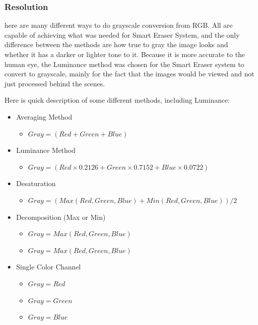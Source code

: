 \subsubsection{Resolution}
here are many different ways to do grayscale conversion from RGB. All are capable of achieving what was needed for Smart Eraser System, and the only difference between the methods are how true to gray the image looks and whether it has a darker or lighter tone to it. Because it is more accurate to the human eye, the Luminance method was chosen for the Smart Eraser system to convert to grayscale, mainly for the fact that the images would be viewed and not just processed behind the scenes.\par
Here is quick description of some different methods, including Luminance:

\begin{itemize}
\item Averaging Method
	\begin{itemize}
		\item  $ Gray = (Red + Green + Blue) $ 	\cite{Helland}
	\end{itemize}
\item Luminance Method
	\begin{itemize}
		\item $ Gray = (Red \times 0.2126 + Green \times 0.7152 + Blue \times 0.0722) $ \cite{Helland}
	\end{itemize}
\item Desaturation
	\begin{itemize}
		\item $ Gray = (Max(Red, Green, Blue) + Min(Red, Green, Blue)) / 2 $ \cite{Helland}
	\end{itemize}
\item Decomposition (Max or Min)
	\begin{itemize}
		\item $ Gray = Max(Red, Green, Blue) $ \cite{Helland}
		\item $ Gray = Max(Red, Green, Blue) $ \cite{Helland}
	\end{itemize}
\item Single Color Channel
	\begin{itemize}
		\item $ Gray = Red $ \cite{Helland}
		\item $ Gray = Green $ \cite{Helland}
		\item $ Gray = Blue $ \cite{Helland}
	\end{itemize}	
\end{itemize}\par

